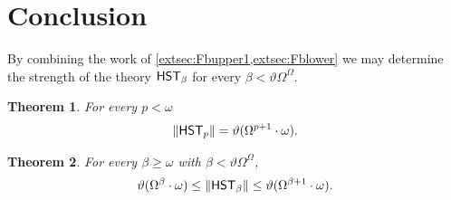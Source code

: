 \documentclass[UKenglish,cleveref,DIV=12]{scrartcl}
\newtheorem{theorem}{Theorem}
\newtheorem{corollary}[lemma]{Corollary}
\theoremstyle{definition}
\theoremstyle{definition}
\begin{document}

\section{Conclusion}\label{extsec:conc}
By combining the work of \cref{extsec:Fbupper1,extsec:Fblower} we may determine
the strength of the theory $\mathsf{HST}_\beta$ for every $\beta<\vartheta\Omega^\Omega$.
\begin{theorem}\label{extthm:Fpstrength}
 For every $p<\omega$
 \begin{align*}
  \lVert{\mathsf{HST}_p}\rVert=\vartheta(\Omega^{p+1}\cdot\omega).
 \end{align*}
\end{theorem}
\begin{theorem}\label{extthm:Fbetastrength}
 For every $\beta\ge\omega$ with $\beta<\vartheta\Omega^\Omega$,
 \begin{align*}
  \vartheta(\Omega^\beta\cdot\omega)\le\lVert{\mathsf{HST}_\beta}\rVert\le\vartheta(\Omega^{\beta+1}\cdot\omega).
 \end{align*}
\end{theorem}
\end{document}

